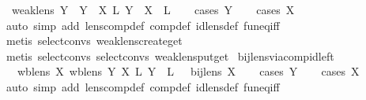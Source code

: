 \begin{isabellebody}
\ \ {\isachardoublequoteopen}weak{\isacharunderscore}lens\ Y\ {\isasymLongrightarrow}\ Y\ {\isacharequal}\ X\ {\isacharsemicolon}\isactrlsub L\ Y\ {\isasymLongrightarrow}\ X\ {\isacharequal}\ {}\isactrlsub L{\isachardoublequoteclose}\isanewline
%
\isadelimproof
\ \ %
\endisadelimproof
%
\isatagproof
{}\isamarkupfalse%
\ {\isacharparenleft}cases\ Y{\isacharparenright}\isanewline
\ \ \isamarkupfalse%
\ {\isacharparenleft}cases\ X{\isacharparenright}\isanewline
\ \ \isamarkupfalse%
\ {\isacharparenleft}auto\ simp\ add{\isacharcolon}\ lens{\isacharunderscore}comp{\isacharunderscore}def\ comp{\isacharunderscore}def\ id{\isacharunderscore}lens{\isacharunderscore}def\ fun{\isacharunderscore}eq{\isacharunderscore}iff{\isacharparenright}\isanewline
\ \ \isamarkupfalse%
\ {\isacharparenleft}metis\ select{\isacharunderscore}convs{\isacharparenleft}{}{\isacharparenright}\ weak{\isacharunderscore}lens{\isachardot}create{\isacharunderscore}get{\isacharparenright}\isanewline
\ \ \isamarkupfalse%
\ {\isacharparenleft}metis\ select{\isacharunderscore}convs{\isacharparenleft}{}{\isacharparenright}\ select{\isacharunderscore}convs{\isacharparenleft}{}{\isacharparenright}\ weak{\isacharunderscore}lens{\isachardot}put{\isacharunderscore}get{\isacharparenright}\isanewline
{}\isamarkupfalse%
%
\endisatagproof
{\isafoldproof}%
%
\isadelimproof
\isanewline
%
\endisadelimproof
\isanewline
{}\isamarkupfalse%
\ bij{\isacharunderscore}lens{\isacharunderscore}via{\isacharunderscore}comp{\isacharunderscore}id{\isacharunderscore}left{\isacharcolon}\isanewline
\ \ {\isachardoublequoteopen}{\isasymlbrakk}\ wb{\isacharunderscore}lens\ X{\isacharsemicolon}\ wb{\isacharunderscore}lens\ Y{\isacharsemicolon}\ X\ {\isacharsemicolon}\isactrlsub L\ Y\ {\isacharequal}\ {}\isactrlsub L\ {\isasymrbrakk}\ {\isasymLongrightarrow}\ bij{\isacharunderscore}lens\ X{\isachardoublequoteclose}\isanewline
%
\isadelimproof
\ \ %
\endisadelimproof
%
\isatagproof
{}\isamarkupfalse%
\ {\isacharparenleft}cases\ Y{\isacharparenright}\isanewline
\ \ \isamarkupfalse%
\ {\isacharparenleft}cases\ X{\isacharparenright}\isanewline
\ \ \isamarkupfalse%
\ {\isacharparenleft}auto\ simp\ add{\isacharcolon}\ lens{\isacharunderscore}comp{\isacharunderscore}def\ comp{\isacharunderscore}def\ id{\isacharunderscore}lens{\isacharunderscore}def\ fun{\isacharunderscore}eq{\isacharunderscore}iff{\isacharparenright}\isanewline

\end{isabellebody}
